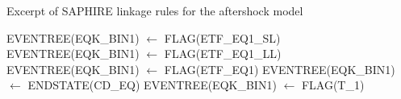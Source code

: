 \begin{algorithm}[H]
\caption{Excerpt of SAPHIRE linkage rules for the aftershock model}
\label{alg:saphire_aftershock_linkage}
\begin{algorithmic}[1]
  \State EVENTREE(EQK\_BIN1) $\gets$ FLAG(ETF\_EQ1\_SL)
  \State EVENTREE(EQK\_BIN1) $\gets$ FLAG(ETF\_EQ1\_LL)
\Else
  \State EVENTREE(EQK\_BIN1) $\gets$ FLAG(ETF\_EQ1)
\EndIf
{}
  \State EVENTREE(EQK\_BIN1) $\gets$ ENDSTATE(CD\_EQ)
  \State EVENTREE(EQK\_BIN1) $\gets$ FLAG(T\_1)
\EndIf
\end{algorithmic}
\end{algorithm}